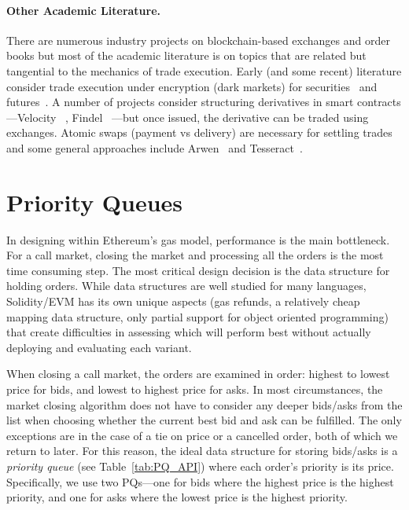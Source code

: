 \paragraph{Other Academic Literature.} There are numerous industry projects on blockchain-based exchanges and order books but most of the academic literature is on topics that are related but tangential to the mechanics of trade execution. Early (and some recent) literature consider trade execution under encryption (\ie dark markets) for securities~\cite{TP07,YSLT10,TW12,cartlidge2019mpc} and futures~\cite{massacci2018futuresmex}. A number of projects consider structuring derivatives in smart contracts---Velocity ~\cite{eskandari2017feasibility}, Findel ~\cite{biryukov2017findel}---but once issued, the derivative can be traded using exchanges. Atomic swaps (\ie payment vs delivery) are necessary for settling trades and some general approaches include Arwen~\cite{heilman2020arwen} and Tesseract~\cite{bentov2017tesseract}.


\section{Priority Queues}\label{sec:pq}



In designing \cm within Ethereum's gas model, performance is the main bottleneck. For a call market, closing the market and processing all the orders is the most time consuming step. The most critical design decision is the data structure for holding orders. While data structures are well studied for many languages, Solidity/EVM has its own unique aspects (\eg gas refunds, a relatively cheap mapping data structure, only partial support for object oriented programming) that create difficulties in assessing which will perform best without actually deploying and evaluating each variant. 

When closing a call market, the orders are examined in order: highest to lowest price for bids, and lowest to highest price for asks. In most circumstances, the market closing algorithm does not have to consider any deeper bids/asks from the list when choosing whether the current best bid and ask can be fulfilled. The only exceptions are in the case of a tie on price or a cancelled order, both of which we return to later. For this reason, the ideal data structure for storing bids/asks is a \textit{priority queue} (see Table~\ref{tab:PQ_API}) where each order's priority is its price. Specifically, we use two PQs---one for bids where the highest price is the highest priority, and one for asks where the lowest price is the highest priority. 

